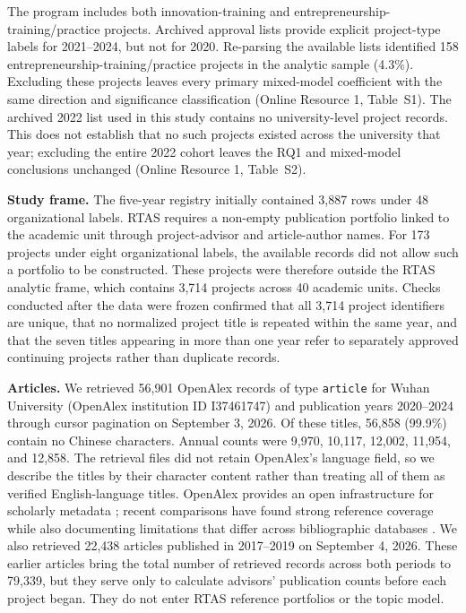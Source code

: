\documentclass[pdflatex,sn-apa]{sn-jnl}
\begin{document}
The program includes both innovation-training and entrepreneurship-training/practice projects. Archived approval lists provide explicit project-type labels for 2021--2024, but not for 2020. Re-parsing the available lists identified 158 entrepreneurship-training/practice projects in the analytic sample (4.3\%). Excluding these projects leaves every primary mixed-model coefficient with the same direction and significance classification (Online Resource 1, Table~S1). The archived 2022 list used in this study contains no university-level project records. This does not establish that no such projects existed across the university that year; excluding the entire 2022 cohort leaves the RQ1 and mixed-model conclusions unchanged (Online Resource 1, Table~S2).

\textbf{Study frame.} The five-year registry initially contained 3,887 rows under 48 organizational labels. RTAS requires a non-empty publication portfolio linked to the academic unit through project-advisor and article-author names. For 173 projects under eight organizational labels, the available records did not allow such a portfolio to be constructed. These projects were therefore outside the RTAS analytic frame, which contains 3,714 projects across 40 academic units. Checks conducted after the data were frozen confirmed that all 3,714 project identifiers are unique, that no normalized project title is repeated within the same year, and that the seven titles appearing in more than one year refer to separately approved continuing projects rather than duplicate records.

\textbf{Articles.} We retrieved 56,901 OpenAlex records of type \texttt{article} for Wuhan University (OpenAlex institution ID I37461747) and publication years 2020--2024 through cursor pagination on September 3, 2026. Of these titles, 56,858 (99.9\%) contain no Chinese characters. Annual counts were 9,970, 10,117, 12,002, 11,954, and 12,858. The retrieval files did not retain OpenAlex's language field, so we describe the titles by their character content rather than treating all of them as verified English-language titles. OpenAlex provides an open infrastructure for scholarly metadata \citep{priem2022openalex}; recent comparisons have found strong reference coverage while also documenting limitations that differ across bibliographic databases \citep{culbert2025openalex}. We also retrieved 22,438 articles published in 2017--2019 on September 4, 2026. These earlier articles bring the total number of retrieved records across both periods to 79,339, but they serve only to calculate advisors' publication counts before each project began. They do not enter RTAS reference portfolios or the topic model.
\end{document}
